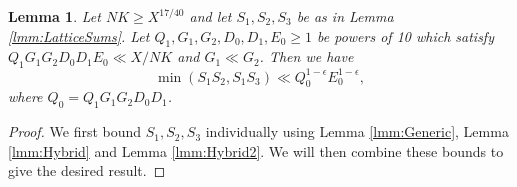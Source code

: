 \documentclass[10pt]{amsart}
\theoremstyle{plain}
\newtheorem{lmm}[thrm]{Lemma}
\numberwithin{sblmm}{thrm}
\numberwithin{equation}{section}
\begin{document}
%
%
%
%
\begin{lmm}\label{lmm:LatticeSumEstimates}
Let $N K\ge X^{17/40}$ and let $S_1,S_2,S_3$ be as in Lemma \ref{lmm:LatticeSums}. Let $Q_1,G_1,G_2,D_0,D_1,E_0\ge 1$ be powers of 10 which satisfy $Q_1 G_1 G_2 D_0 D_1 E_0\ll X/N K$ and $G_1\ll G_2$. Then we have
\[
\min(S_1S_2,S_1S_3)\ll Q_0^{1-\epsilon}E_0^{1-\epsilon},
\]
where $Q_0=Q_1 G_1 G_2 D_0 D_1$.
\end{lmm}
%
%
%
%
\begin{proof}
We first bound $S_1,S_2,S_3$ individually using Lemma \ref{lmm:Generic}, Lemma \ref{lmm:Hybrid} and Lemma \ref{lmm:Hybrid2}. We will then combine these bounds to give the desired result.


\end{proof}
\end{document}
